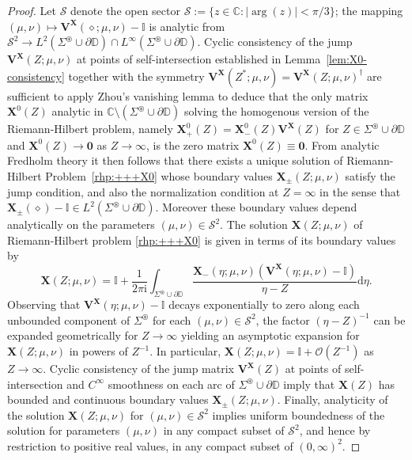 \documentclass[12pt]{amsart}
\numberwithin{equation}{section}
\newcommand{\dd}{\mathrm{d}}
\newcommand{\ii}{\mathrm{i}}
\newcommand{\C}{\mathbb{C}}
\newcommand{\bigo}[1]{ \mathcal{O}\! \left( #1 \right) }
\begin{document}
\begin{proof} 
Let $\mathcal{S}$ denote the open sector $\mathcal{S} := \{ z\in \C: |\arg(z)| < \pi/3 \}$; the mapping $( \mu,\nu) \mapsto \mathbf{V^X}(\diamond;\mu,\nu)- \mathbb{I}$ is analytic from $\mathcal{S}^2 \to  L^2(\Sigma^\circledast \cup \partial \mathbb{D})\cap L^\infty(\Sigma^\circledast\cup\partial\mathbb{D})$. Cyclic consistency of the jump $\mathbf{V^X}(Z;\mu,\nu)$ at points of self-intersection established in Lemma~\ref{lem:X0-consistency} together with the symmetry $\mathbf{V^X}(Z^*;\mu,\nu) = \mathbf{V^X}(Z;\mu,\nu)^\dagger$ are sufficient to apply Zhou's vanishing lemma \cite{Zhou89} to deduce that the only matrix $\mathbf{X}^0(Z)$ analytic in $\C \setminus (\Sigma^\circledast \cup \partial \mathbb{D})$ solving the homogenous version of the Riemann-Hilbert problem, namely $\mathbf{X}^0_{+}(Z) =\mathbf{X}^0_{-}(Z) \mathbf{V^X}(Z)$ for $Z \in \Sigma^\circledast \cup \partial \mathbb{D}$ and $\mathbf{X}^0(Z) \to \mathbf{0}$ as $Z \to \infty$, is the zero matrix $\mathbf{X}^0(Z) \equiv \mathbf{0}$.
From analytic Fredholm theory it then follows that there exists a unique solution of Riemann-Hilbert Problem~\ref{rhp:+++X0} whose boundary values $\mathbf{X}_\pm(Z;\mu,\nu)$ satisfy the jump condition, and also the normalization condition at $Z = \infty$ in the sense that $\mathbf{X}_\pm(\diamond) - \mathbb{I} \in L^2(\Sigma^\circledast \cup \partial \mathbb{D})$. Moreover these boundary values depend analytically on the parameters $(\mu,\nu) \in \mathcal{S}^2$. 
The solution $\mathbf{X}(Z;\mu,\nu)$ of Riemann-Hilbert problem \ref{rhp:+++X0} is given in terms of its boundary values by 
\begin{equation}
	\mathbf{X}(Z;\mu,\nu) = \mathbb{I} +  \frac{1}{2\pi \ii} \int_{\Sigma^\circledast \cup \partial \mathbb{D}} \frac{ \mathbf{X}_-(\eta;\mu,\nu) (\mathbf{V^X}(\eta;\mu,\nu) - \mathbb{I})}{\eta-Z} \dd \eta.
\end{equation}
Observing that $\mathbf{V^X}(\eta;\mu,\nu) - \mathbb{I}$ decays exponentially to zero along each unbounded component of $\Sigma^\circledast$ for each $(\mu,\nu) \in \mathcal{S}^2$, the factor $(\eta-Z)^{-1}$ can be expanded geometrically for $Z \to \infty$ yielding an asymptotic expansion for $\mathbf{X}(Z;\mu,\nu)$ in powers of $Z^{-1}$.  In particular, $\mathbf{X}(Z;\mu,\nu) = \mathbb{I}+\bigo{Z^{-1}}$ as $Z \to \infty$. Cyclic consistency of the jump matrix $\mathbf{V^X}(Z)$ at points of self-intersection and $C^\infty$ smoothness on each arc of $\Sigma^\circledast \cup \partial \mathbb{D}$ imply that $\mathbf{X}(Z)$ has bounded and continuous boundary values $\mathbf{X}_\pm(Z;\mu,\nu)$. Finally, analyticity of the solution $\mathbf{X}(Z;\mu,\nu)$ for $(\mu,\nu) \in \mathcal{S}^2$ implies uniform boundedness of the solution for parameters $(\mu,\nu)$ in any compact subset of $\mathcal{S}^2$, and hence by restriction to positive real values, in any compact subset of $(0,\infty)^2$.
\end{proof}	
\end{document}
